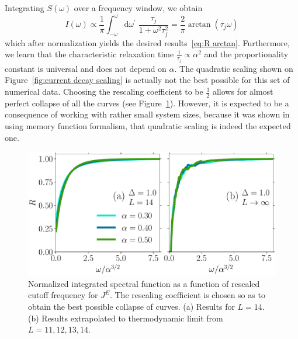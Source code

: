Integrating \(S(\omega)\) over a frequency window, we obtain
\begin{equation*}
  I(\omega) \propto \frac{1}{\pi}\int_{-\omega}^{\omega}\mathrm{d}\omega^{\prime}\; 
  \frac{\tau_{j}}{1+\omega^2\tau_{j}^2} = \frac{2}{\pi} \arctan(\tau_{j} \omega)
\end{equation*}
which after normalization yields the desired results~\eqref{eq:R arctan}. Furthermore, we learn that the 
characteristic relaxation time \(\frac{1}{\tau_{j}} \propto \alpha^2\) and the proportionality
constant is universal and does not depend on \(\alpha\).
The quadratic scaling shown on Figure~\ref{fig:current decay scaling} is actually not the
best possible for this set of numerical data. Choosing the rescaling coefficient to be
\(\frac{3}{2}\) allows for almost perfect collapse of all the curves 
(see Figure~\ref{fig:current decay perfect scaling}). However, it is expected to be a consequence
of working with rather small system sizes, because it was shown 
in~\textcite{Mierzejewski2015Approx} using memory function formalism, that quadratic scaling
is indeed the expected one.
\begin{figure}[ht]
  \centering
  \includegraphics[width=\figsize\textwidth]{Figures/current_perfect_scaling_small.pdf}
  \caption{Normalized integrated spectral function as a function of 
  rescaled cutoff frequency for \(J^E\). The rescaling coefficient is chosen so as to obtain the 
  best possible collapse of curves. (a) Results for \(L=14\). (b) Results extrapolated
   to thermodynamic limit from \(L=11,12,13,14\).}\label{fig:current decay perfect scaling}
\end{figure}

